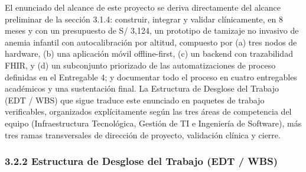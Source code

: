 \documentclass[11pt,a4paper]{article}
\begin{document}
El enunciado del alcance de este proyecto se deriva directamente del alcance preliminar de la sección 3.1.4: construir, integrar y validar clínicamente, en 8 meses y con un presupuesto de S/ 3,124, un prototipo de tamizaje no invasivo de anemia infantil con autocalibración por altitud, compuesto por (a) tres nodos de hardware, (b) una aplicación móvil offline-first, (c) un backend con trazabilidad FHIR, y (d) un subconjunto priorizado de las automatizaciones de proceso definidas en el Entregable 4; y documentar todo el proceso en cuatro entregables académicos y una sustentación final. La Estructura de Desglose del Trabajo (EDT / WBS) que sigue traduce este enunciado en paquetes de trabajo verificables, organizados explícitamente según las tres áreas de competencia del equipo (Infraestructura Tecnológica, Gestión de TI e Ingeniería de Software), más tres ramas transversales de dirección de proyecto, validación clínica y cierre.

\subsubsection{3.2.2 Estructura de Desglose del Trabajo (EDT / WBS)}\label{estructura-de-desglose-del-trabajo-edt-wbs}
\end{document}
